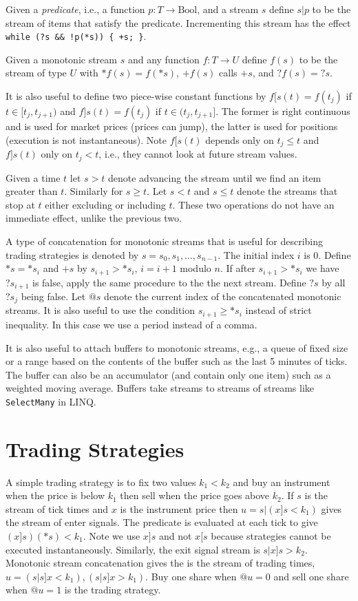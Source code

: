 \documentclass[12pt,letterpaper,fleqn]{report}
\begin{document}
Given a {\em predicate}, i.e., a function \(p\colon T\to \mathrm{Bool}\),
and a stream \(s\) define \(s|p\) to be the stream of items that satisfy
the predicate. Incrementing this stream has the effect {\tt while (?s \&\&
!p(*s)) \{ +s; \}}.

Given a monotonic stream \(s\) and any function \(f\colon T\to U\)
define \(f(s)\) to be the stream of type \(U\) with \(*f(s) = f(*s)\),
\(+f(s)\) calls \(+s\), and \(?f(s) = ?s\).

It is also useful to define
two piece-wise constant functions by \(f[s(t) = f(t_j)\) if \(t\in [t_j,
t_{j+1})\) and \(f]s(t) = f(t_j)\) if \(t\in (t_j, t_{j+1}]\). The former
is right continuous and is used for market prices (prices can jump),
the latter is used for positions (execution is not instantaneous).
Note \(f[s(t)\) depends only on \(t_j \le t\) and \(f]s(t)\) only on
\(t_j < t\), i.e., they cannot look at future stream values.

Given a time \(t\) let \(s > t\) denote advancing the stream until
we find an item greater than \(t\). Similarly for \(s \ge t\). Let
\(s < t\) and \(s \le t\) denote the streams that stop at \(t\)
either excluding or including \(t\). These two operations do
not have an immediate effect, unlike the previous two.

A type of concatenation for monotonic streams that is useful for describing
trading strategies is denoted by \(s = s_0,s_1,\dots,s_{n-1}\).
The initial index \(i\) is 0. Define \(*s = *s_i\) and
\(+s\) by \(s_{i+1}>*s_i\), \(i = i + 1\) modulo \(n\).
If after \(s_{i+1}>*s_i\) we have \(?s_{i+1}\) is false, apply the same 
procedure to the the next stream.
Define \(?s\) by all \(?s_j\) being false. 
Let \(@ s\) denote the current index of the concatenated
monotonic streams. It is also useful to use the condition
\(s_{i+1}\ge *s_i\) instead of strict inequality. In this case
we use a period instead of a comma.

It is also useful to attach buffers to monotonic streams,
e.g., a queue of fixed size or a range based on the contents of
the buffer such as the last 5 minutes of ticks. The
buffer can also be an accumulator (and contain only one item) such
as a weighted moving average. Buffers take streams to
streams of streams like {\tt SelectMany} in LINQ.

\section{Trading Strategies}
A simple trading strategy is to fix two values \(k_1 < k_2\) and buy
an instrument when the price is below \(k_1\) then sell when the
price goes above \(k_2\). If \(s\) is the stream of tick times and
\(x\) is the instrument price then \(u = s|(x]s < k_1)\) gives
the stream of enter signals. The predicate is evaluated at
each tick to give \((x]s)(*s) < k_1\). Note we use \(x]s\) and
not \(x[s\) because strategies cannot be executed instantaneously.
Similarly, the exit signal
stream is \(s|x]s > k_2\). 
Monotonic stream concatenation gives the
is the stream of trading times, \(u = (s|s]x < k_1),(s|s]x > k_1)\).
Buy one share when \(@u = 0\)
and sell one share when \(@u = 1\) is the trading strategy.
\end{document}
